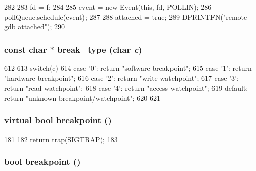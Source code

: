 \begin{DoxyCode}
282 {
283     fd = f;
284 
285     event = new Event(this, fd, POLLIN);
286     pollQueue.schedule(event);
287 
288     attached = true;
289     DPRINTFN("remote gdb attached\n");
290 }
\end{DoxyCode}
\hypertarget{classBaseRemoteGDB_a16c567d9c992eb13819358b18ab219b6}{
\subsubsection[{break\_\-type}]{\setlength{\rightskip}{0pt plus 5cm}const char $\ast$ break\_\-type (char {\em c})}}
\label{classBaseRemoteGDB_a16c567d9c992eb13819358b18ab219b6}



\begin{DoxyCode}
612 {
613     switch(c) {
614       case '0': return "software breakpoint";
615       case '1': return "hardware breakpoint";
616       case '2': return "write watchpoint";
617       case '3': return "read watchpoint";
618       case '4': return "access watchpoint";
619       default: return "unknown breakpoint/watchpoint";
620     }
621 }
\end{DoxyCode}
\hypertarget{classBaseRemoteGDB_aa9fdfc3926a9047bc0fb3d7b13030064}{
\subsubsection[{breakpoint}]{\setlength{\rightskip}{0pt plus 5cm}virtual bool breakpoint ()}}
\label{classBaseRemoteGDB_aa9fdfc3926a9047bc0fb3d7b13030064}



\begin{DoxyCode}
181     {
182         return trap(SIGTRAP);
183     }
\end{DoxyCode}
\hypertarget{classBaseRemoteGDB_ae59ed2201db88c0668ca26040f6a3ad0}{
\subsubsection[{breakpoint}]{\setlength{\rightskip}{0pt plus 5cm}bool breakpoint ()}}
\label{classBaseRemoteGDB_ae59ed2201db88c0668ca26040f6a3ad0}



